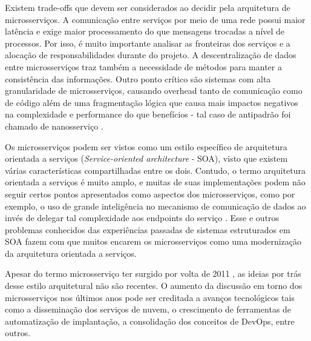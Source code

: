 Existem trade-offs que devem ser considerados ao decidir pela arquitetura de microsserviços. A comunicação entre serviços por meio de uma rede possui maior latência e exige maior processamento do que mensagens trocadas a nível de processos. Por isso, é muito importante analisar as fronteiras dos serviços e a alocação de responsabilidades durante do projeto. A descentralização de dados entre microsserviços traz também a necessidade de métodos para manter a consistência das informações. Outro ponto crítico são sistemas com alta granularidade de microsserviços, causando overhead tanto de comunicação como de código além de uma fragmentação lógica que causa mais impactos negativos na complexidade e performance do que benefícios - tal caso de antipadrão foi chamado de nanosserviço \cite{rotem}.

Os microsserviços podem ser vistos como um estilo específico de arquitetura orientada a serviços (\textit{Service-oriented architecture} - SOA), visto que existem várias características compartilhadas entre os dois. Contudo, o termo arquitetura orientada a serviços é muito amplo, e muitas de suas implementações podem não seguir certos pontos apresentados como aspectos dos microsserviços, como por exemplo, o uso de grande inteligência no mecanismo de comunicação de dados ao invés de delegar tal complexidade aos endpoints do serviço \cite{james}. Esse e outros problemas conhecidos das experiências passadas de sistemas estruturados em SOA fazem com que muitos encarem os microsserviços como uma modernização da arquitetura orientada a serviços.

Apesar do termo microsserviço ter surgido por volta de 2011 \cite{james}, as ideias por trás desse estilo arquitetural não são recentes. O aumento da discussão em torno dos microsserviços nos últimos anos pode ser creditada a avanços tecnológicos tais como a disseminação dos serviços de nuvem, o crescimento de ferramentas de automatização de implantação, a consolidação dos conceitos de DevOps, entre outros.
